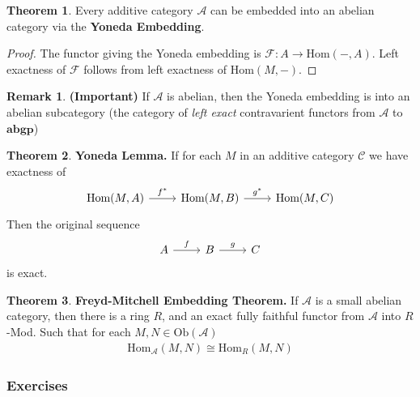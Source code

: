 \documentclass[11pt]{article}
\theoremstyle{definition}
\newtheorem{thm}{Theorem}
\newtheorem*{rmk}{Remark}
\newcommand{\homo}{\text{Hom}}
\begin{document}
    \begin{thm}
        Every additive category \(\mathcal{A}\) can be embedded into an abelian category via the \textbf{Yoneda Embedding}.
    \end{thm}
    \begin{proof}
        The functor giving the Yoneda embedding is \(\mathcal{F}: A \to \homo(-,A)\). Left exactness of \(\mathcal{F}\) follows from left exactness of \(\homo(M,-)\). 
    \end{proof}
    \begin{rmk}\label{yoneda rmk}
        \textbf{(Important)} If \(\mathcal{A}\) is abelian, then the Yoneda embedding is into an abelian subcategory (the category of \emph{left exact} contravarient functors from \(\mathcal{A}\) to \(\textbf{abgp}\))
    \end{rmk}
    \begin{thm}
        \textbf{Yoneda Lemma.}
        If for each \(M\) in an additive category \(\mathcal{C}\) we have exactness of
        \begin{equation*}
            \begin{tikzcd}
                \homo(M,A) \arrow[r,"{f^*}"] &\homo(M,B) \arrow[r,"{g^*}"] &\homo(M,C)
            \end{tikzcd}
        \end{equation*}
        Then the original sequence
        \begin{equation*}
            \begin{tikzcd}
                A \arrow[r,"{f}"] &B \arrow[r,"{g}"] &C
            \end{tikzcd}
        \end{equation*}
        is exact.
    \end{thm}
    \begin{thm}
        \textbf{Freyd-Mitchell Embedding Theorem.} If \(\mathcal{A}\) is a small abelian category, then there is a ring \(R\), and an exact fully faithful functor from \(\mathcal{A}\) into \(R\)-Mod. Such that for each \(M,N \in \text{Ob}(\mathcal{A})\)
        \begin{align*}
            \homo_\mathcal{A}(M,N) \cong \homo_R(M,N)
        \end{align*}
    \end{thm}
    

    \subsubsection{Exercises}
\end{document}
